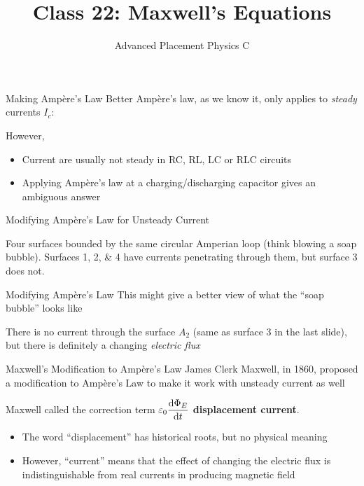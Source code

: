 \documentclass[12pt,aspectratio=169]{beamer}
\title{Class 22: Maxwell's Equations}
\subtitle{Advanced Placement Physics C}
\begin{document}
\begin{frame}
  \maketitle
\end{frame}


\begin{frame}{Making Amp\`{e}re's Law Better}
  Amp\`{e}re's law, as we know it, only applies to \emph{steady} currents $I_c$:

  However,
  \begin{itemize}
  \item Current are usually not steady in RC, RL, LC or RLC circuits
  \item Applying Amp\`{e}re's law at a charging/discharging capacitor gives an
    ambiguous answer
  \end{itemize}
\end{frame}



\begin{frame}{Modifying Amp\`{e}re's Law for Unsteady Current}
  \begin{center}
  \end{center}
  Four surfaces bounded by the same circular Amperian loop
  (think blowing a soap bubble). Surfaces \numlist{1;2;4} have currents
  penetrating through them, but surface \num{3} does not.
\end{frame}



\begin{frame}{Modifying Amp\`{e}re's Law}
  This might give a better view of what the ``soap bubble'' looks like
  \begin{center}
  \end{center}
  There is no current through the surface $A_2$ (same as surface \num{3} in the
  last slide), but there is definitely a changing \emph{electric flux}
\end{frame}



\begin{frame}{Maxwell's Modification to Amp\`{e}re's Law}
  James Clerk Maxwell, in 1860, proposed a modification to Amp\`{e}re's Law
  to make it work with unsteady current as well


  Maxwell called the correction term $\displaystyle\varepsilon_0\diff{\Phi_E}t$
  \textbf{displacement current}.
  \begin{itemize}
  \item The word ``displacement'' has historical roots, but no physical meaning
  \item However, ``current'' means that the effect of changing the electric
    flux is indistinguishable from real currents in producing magnetic field
  \end{itemize}
\end{frame}
\end{document}
